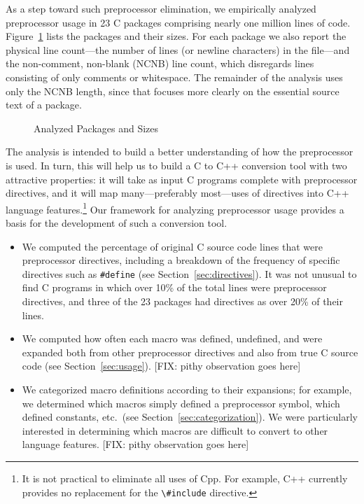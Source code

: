 As a step toward such preprocessor elimination, we empirically analyzed
preprocessor usage in 23 C packages comprising nearly one million lines of
code.  Figure~\ref{fig:packages} lists the packages and their sizes.
For each package we also report the physical line count---the
number of lines (or newline characters) in the file---and the non-comment,
non-blank (NCNB) line count, which disregards lines consisting of only
comments or whitespace.  The remainder of the analysis uses only the NCNB
length, since that focuses more clearly on the essential source text of a
package.

\begin{figure}
{\small
  \setlength{\tabcolsep}{.25em}
  
}
\caption{Analyzed Packages and Sizes\label{fig:packages}}
\end{figure}

The analysis is intended to build a better understanding of how the
preprocessor is used.  In turn, this will help us to build a C to C++
conversion tool with two attractive properties: it will take as input C
programs complete with preprocessor directives, and it will map
many---preferably most---uses of directives into C++ language
features.\footnote{It is not practical to eliminate all uses of Cpp.  For
  example, C++ currently provides no replacement for the \verb+\#include+
  directive.} Our framework for analyzing preprocessor usage provides a
basis for the development of such a conversion tool.

\begin{itemize}\itemsep 0pt \parskip 0pt

\item We computed the percentage of original C source code lines that
were preprocessor directives, including a breakdown of the frequency
of specific directives such as \verb+#define+ (see
Section~\ref{sec:directives}). It was not unusual to find C programs 
in which over 10\% of the total lines were preprocessor directives, and 
three of the 23 packages had directives as over 20\% of their lines.

\item We computed how often each macro was
defined,  undefined, and
were expanded both from other preprocessor directives and also from
true C source code (see Section~\ref{sec:usage}).
[FIX: pithy observation goes here]

\item We categorized macro definitions according to their expansions; 
      for example, we determined which macros simply
      defined a preprocessor symbol, which defined constants, etc.~(see
      Section~\ref{sec:categorization}).  We
      were particularly interested in determining which macros are
      difficult to convert to other language
      features.  [FIX: pithy observation goes here]

\end{itemize}

